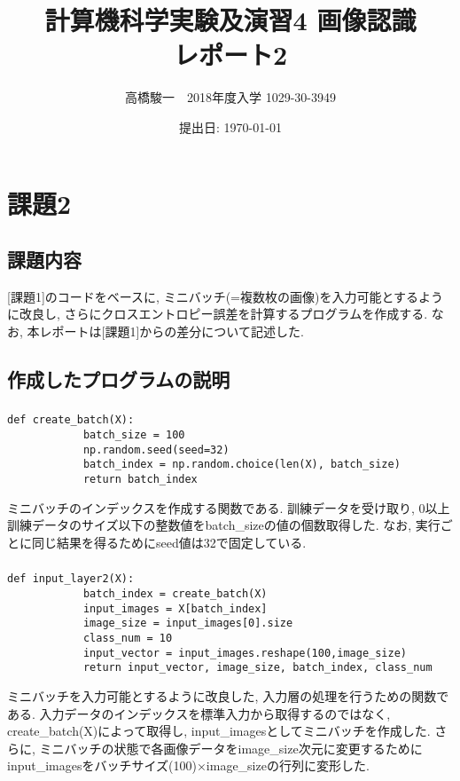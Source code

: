 \documentclass[a4j, titlepage]{jarticle}
\begin{document}
\title{計算機科学実験及演習4 画像認識　\\ \bf レポート2}
\author{高橋駿一　2018年度入学 1029-30-3949}
\date{提出日: \today} %
\maketitle

\clearpage

\section*{課題2}
\subsection*{課題内容}
[課題1]のコードをベースに, ミニバッチ(=複数枚の画像)を入力可能とするように改良し, さらにクロスエントロピー誤差を計算するプログラムを作成する. なお, 本レポートは[課題1]からの差分について記述した.

\subsection*{作成したプログラムの説明}
    \subsubsection*{}
        \begin{lstlisting}[caption=ミニバッチのインデックスを作成,label=fuga]
        def create_batch(X):
            batch_size = 100
            np.random.seed(seed=32)
            batch_index = np.random.choice(len(X), batch_size)
            return batch_index
        \end{lstlisting}
        ミニバッチのインデックスを作成する関数である.
        訓練データを受け取り, 0以上訓練データのサイズ以下の整数値をbatch\_sizeの値の個数取得した. なお, 実行ごとに同じ結果を得るためにseed値は32で固定している.

    \subsubsection*{}
        \begin{lstlisting}[caption=ミニバッチを活用可能な入力層の処理,label=fuga]
        def input_layer2(X):
            batch_index = create_batch(X)
            input_images = X[batch_index]
            image_size = input_images[0].size
            class_num = 10
            input_vector = input_images.reshape(100,image_size)
            return input_vector, image_size, batch_index, class_num
        \end{lstlisting}
        ミニバッチを入力可能とするように改良した, 入力層の処理を行うための関数である.
        入力データのインデックスを標準入力から取得するのではなく, create\_batch(X)によって取得し, input\_imagesとしてミニバッチを作成した. さらに, ミニバッチの状態で各画像データをimage\_size次元に変更するためにinput\_imagesをバッチサイズ(100)×image\_sizeの行列に変形した.
\end{document}
